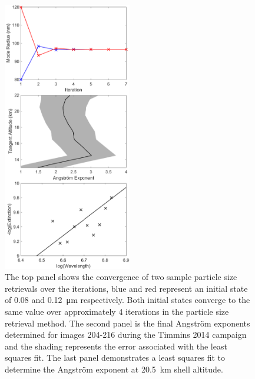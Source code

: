 \documentclass[12pt]{article}
\begin{document}
\clearpage

\begin{figure}
\includegraphics[width=0.5\textwidth]{./Images/5-4-ParticalSize.pdf}
    \caption{The top panel shows the convergence of two sample particle size retrievals over the iterations, blue and red represent an initial state of 0.08 and 
0.12~\si{\micro\metre} respectively. Both initial states converge to the same value over approximately 4 iterations in the particle size retrieval method. The second panel 
is the final Angstr\"{o}m exponents determined for images 204-216 during the Timmins 2014 campaign and the shading represents the error associated with the least squares 
fit. The last panel demonstrates a least squares fit to determine the Angstr\"{o}m exponent at 20.5~km shell altitude.}
    \label{fig:ParticleSize}
\end{figure}
\end{document}
